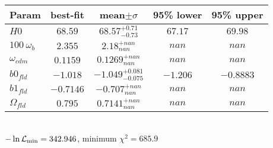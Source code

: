 \begin{tabular}{|l|c|c|c|c|} 
 \hline 
Param & best-fit & mean$\pm\sigma$ & 95\% lower & 95\% upper \\ \hline 
$H0$ &$68.59$ & $68.57_{-0.73}^{+0.71}$ & $67.17$ & $69.98$ \\ 
$100~\omega_{b }$ &$2.355$ & $2.18_{nan}^{+nan}$ & $nan$ & $nan$ \\ 
$\omega_{cdm }$ &$0.1159$ & $0.1269_{nan}^{+nan}$ & $nan$ & $nan$ \\ 
$b0_{fld }$ &$-1.018$ & $-1.049_{-0.075}^{+0.081}$ & $-1.206$ & $-0.8883$ \\ 
$b1_{fld }$ &$-0.7146$ & $-0.707_{nan}^{+nan}$ & $nan$ & $nan$ \\ 
$\Omega_{fld }$ &$0.795$ & $0.7141_{nan}^{+nan}$ & $nan$ & $nan$ \\ 
\hline 
 \end{tabular} \\ 
$-\ln{\cal L}_\mathrm{min} =342.946$, minimum $\chi^2=685.9$ \\ 
